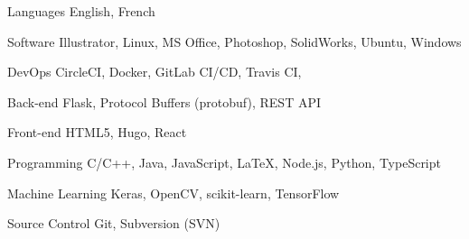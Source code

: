 \begin{cvskills}

\cvskill
{Languages}
{English, French}

\cvskill
{Software}
{
Illustrator,
Linux,
MS Office,
Photoshop,
SolidWorks,
Ubuntu,
Windows
}

\cvskill
{DevOps}
{
CircleCI,
Docker,
GitLab CI/CD,
Travis CI,
}

\cvskill
{Back-end}
{
Flask,
Protocol Buffers (protobuf),
REST API
}

\cvskill
{Front-end}
{
HTML5,
Hugo,
React
}

\cvskill
{Programming}
{
C/C++,
Java,
JavaScript,
LaTeX,
Node.js,
Python,
TypeScript
}

\cvskill
{Machine Learning}
{
Keras,
OpenCV,
scikit-learn,
TensorFlow
}

\cvskill
{Source Control}
{
Git,
Subversion (SVN)
}

\end{cvskills}
